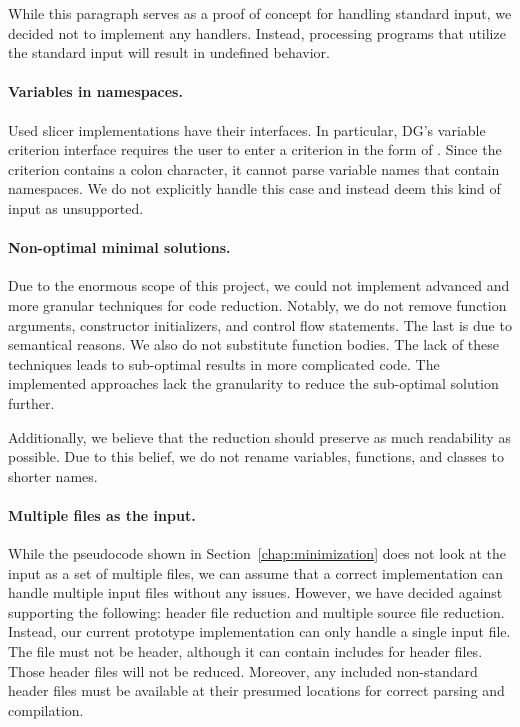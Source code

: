 While this paragraph serves as a proof of concept for handling standard 
input, we decided not to implement any handlers. 
Instead, processing programs that utilize the standard input will result in 
undefined behavior.


\paragraph{Variables in namespaces.}
Used slicer implementations have their interfaces. 
In particular, DG's variable criterion interface requires the user to enter 
a criterion in the form of . 
Since the criterion contains a colon character, it cannot parse variable 
names that contain namespaces. 
We do not explicitly handle this case and instead deem this kind of input as 
unsupported.

\paragraph{Non-optimal minimal solutions.}
Due to the enormous scope of this project, we could not implement advanced 
and more granular techniques for code reduction. 
Notably, we do not remove function arguments, constructor initializers, and 
control flow statements. 
The last is due to semantical reasons. 
We also do not substitute function bodies. 
The lack of these techniques leads to sub-optimal results in more 
complicated code. 
The implemented approaches lack the granularity to reduce the sub-optimal 
solution further. 

Additionally, we believe that the reduction should preserve as much 
readability as possible. 
Due to this belief, we do not rename variables, functions, and classes to 
shorter names.

\paragraph{Multiple files as the input.}
While the pseudocode shown in Section~\ref{chap:minimization} does not look 
at the input as a set of multiple files, we can assume that a correct 
implementation can handle multiple input files without any issues. 
However, we have decided against supporting the following: header file 
reduction and multiple source file reduction. 
Instead, our current prototype implementation can only handle a single input
file.
The file must not be header, although it can contain includes for header 
files. 
Those header files will not be reduced. 
Moreover, any included non-standard header files must be available at their 
presumed locations for correct parsing and compilation.

